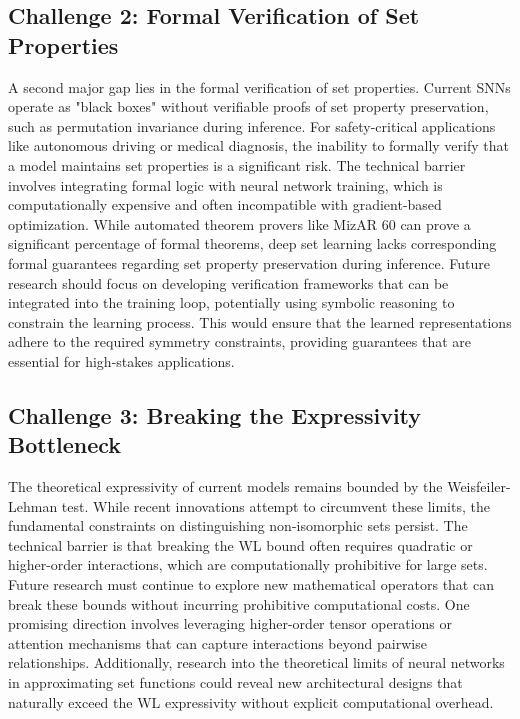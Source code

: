\documentclass{article}
\begin{document}
\subsection{Challenge 2: Formal Verification of Set Properties}

\label{sec:challenge_2_formal_verification_of_set_p}

A second major gap lies in the formal verification of set properties. Current SNNs operate as "black boxes" without verifiable proofs of set property preservation, such as permutation invariance during inference. For safety-critical applications like autonomous driving or medical diagnosis, the inability to formally verify that a model maintains set properties is a significant risk. The technical barrier involves integrating formal logic with neural network training, which is computationally expensive and often incompatible with gradient-based optimization. While automated theorem provers like MizAR 60 can prove a significant percentage of formal theorems, deep set learning lacks corresponding formal guarantees regarding set property preservation during inference. Future research should focus on developing verification frameworks that can be integrated into the training loop, potentially using symbolic reasoning to constrain the learning process. This would ensure that the learned representations adhere to the required symmetry constraints, providing guarantees that are essential for high-stakes applications.

\subsection{Challenge 3: Breaking the Expressivity Bottleneck}

\label{sec:challenge_3_breaking_the_expressivity_bo}

The theoretical expressivity of current models remains bounded by the Weisfeiler-Lehman test. While recent innovations attempt to circumvent these limits, the fundamental constraints on distinguishing non-isomorphic sets persist. The technical barrier is that breaking the WL bound often requires quadratic or higher-order interactions, which are computationally prohibitive for large sets. Future research must continue to explore new mathematical operators that can break these bounds without incurring prohibitive computational costs. One promising direction involves leveraging higher-order tensor operations or attention mechanisms that can capture interactions beyond pairwise relationships. Additionally, research into the theoretical limits of neural networks in approximating set functions could reveal new architectural designs that naturally exceed the WL expressivity without explicit computational overhead.
\end{document}
